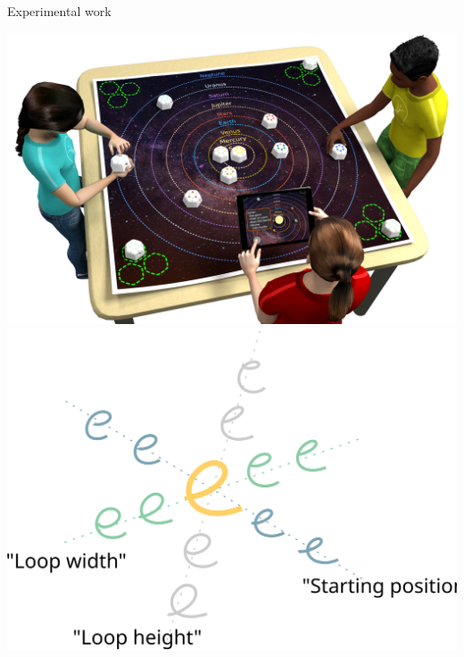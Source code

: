 \documentclass[compress]{beamer}
\begin{document}
\begin{frame}{Experimental work}
            \hyperlink{cellulo}{\includegraphics[height=0.2\paperheight]{cellulo/concept-solar-system}}
            \hspace{0.5em}
            \hyperlink{cowriter-impl}{\includegraphics[height=0.2\paperheight]{cowriter/pca}}


\end{frame}
\end{document}
